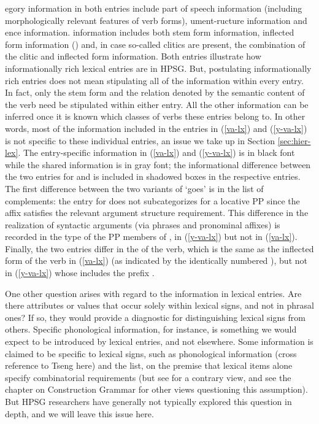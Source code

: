 \documentclass[output=paper]{langsci/langscibook}
\begin{document}
egory information in both entries include part of speech information (including morphologically relevant features of verb forms), ument-ructure information and ence information.  information includes both stem form information, inflected form information () and, in case so-called clitics are present, the combination of the clitic and inflected form information. Both entries illustrate how informationally rich lexical entries are in HPSG. But, postulating informationally rich entries does not mean stipulating all of the information within every entry. In fact, only the stem form and the relation denoted by the semantic content of the verb  need be stipulated within either entry. All the other information can be inferred once it is known which classes of verbs these entries belong to. In other words, most of the information included in the entries in (\ref{va-lx}) and (\ref{y-va-lx}) is not specific to these individual entries, an issue we take up in Section \ref{sec:hier-lex}.  The entry-specific information in (\ref{va-lx}) and (\ref{y-va-lx}) is in black font while the shared information is in gray font; the informational difference between the two entries for  and  is included in shadowed boxes in the respective entries. The first difference between the two variants of  `goes' is in the list of complements: the entry for  does not subcategorizes for a locative PP since the affix  satisfies the relevant argument structure requirement. This difference in the realization of syntactic arguments (via phrases and pronominal affixes) is recorded in the type of the PP members of ,  in (\ref{y-va-lx}) but not in (\ref{va-lx}). Finally, the two entries differ in the  of the verb, which is the same as the inflected form of the verb in (\ref{va-lx}) (as indicated by the identically numbered ), but not in (\ref{y-va-lx}) whose  includes the prefix .  

One other question arises with regard to the information in lexical entries.
Are there attributes or values that occur solely within lexical signs, and not in phrasal ones?
If so, they would provide a diagnostic for distinguishing lexical signs from others.
Specific phonological information, for instance, is something we would expect to be introduced by lexical entries, and not elsewhere.
Some information is claimed to be specific to lexical signs, such as phonological information (cross reference to Tseng here) and the  list, on the premise that lexical items alone specify combinatorial requirements (but see \citet{Przepiorkowski2001} for a contrary view, and see the chapter on Construction Grammar for other views questioning this assumption).
But HPSG researchers have generally not typically explored this question in depth, and we will leave this issue here.
\end{document}
